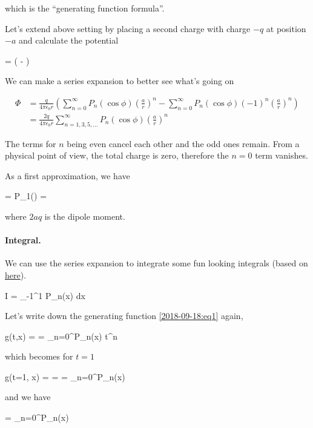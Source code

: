 which is the ``generating function formula''.

Let's extend above setting by placing a second charge with charge $-q$ at position $-a$ and calculate the potential

\bee
\Phi =  \left(  -  \right)
\eee

We can make a series expansion to better see what's going on

\begin{align*}
  \Phi &= \frac{q}{4\pi\epsilon_0 r} \left( \sum_{n=0}^\infty P_n(\cos\phi)\left(\frac{a}{r} \right)^n - \sum_{n=0}^\infty P_n(\cos\phi) (-1)^n \left(\frac{a}{r} \right)^n \right) \\
  &= \frac{2q}{4\pi\epsilon_0 r} \sum_{n=1,3,5,\ldots}^\infty P_n(\cos\phi)\left(\frac{a}{r} \right)^n
\end{align*}

The terms for $n$ being even cancel each other and the odd ones remain. From a physical point of view, the total charge is zero, therefore the $n=0$ term vanishes.

As a first approximation, we have

\bee
\Phi =  P_1(\cos\phi)  =  \cos\phi
\eee

where $2aq$ is the dipole moment.

\paragraph{Integral.} We can use the series expansion to integrate some fun looking integrals (based on \href{https://math.stackexchange.com/questions/1611224/calculating-i-int-11-dfrac1-sqrt1-xp-nx-dx-where-p-n-is-a?rq=1}{here}).

\bee
I = \int_{-1}^1  P_n(x) dx
\eee

Let's write down the generating function \eqref{2018-09-18:eq1} again,

\bee
g(t,x) =  = \sum_{n=0}^\infty P_n(x) t^n
\eee

which becomes for $t=1$

\bee
g(t=1, x) =  =   = \sum_{n=0}^\infty P_n(x)
\eee

and we have

\bee
{} =  \sum_{n=0}^\infty P_n(x)
\eee

